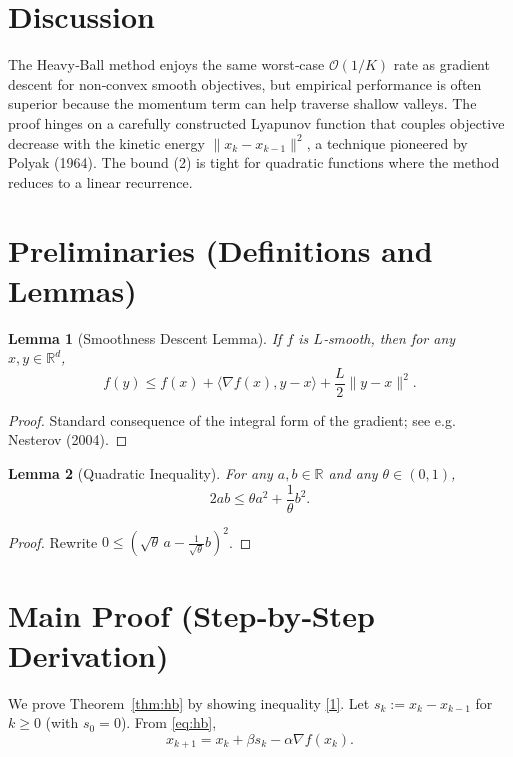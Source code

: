 \documentclass{article}
\newtheorem{lemma}{Lemma}
\newcommand{\R}{\mathbb{R}}
\begin{document}
\section*{Discussion}
The Heavy‑Ball method enjoys the same worst‑case $\mathcal{O}(1/K)$ rate as gradient descent for non‑convex smooth objectives, but empirical performance is often superior because the momentum term can help traverse shallow valleys. The proof hinges on a carefully constructed Lyapunov function that couples objective decrease with the kinetic energy $\|x_{k}-x_{k-1}\|^{2}$, a technique pioneered by Polyak (1964). The bound (2) is tight for quadratic functions where the method reduces to a linear recurrence.

\newpage
\section*{Preliminaries (Definitions and Lemmas)}
\begin{lemma}[Smoothness Descent Lemma]\label{lem:smooth}
If $f$ is $L$‑smooth, then for any $x,y\in\R^{d}$,
\[
f(y)\le f(x)+\langle \nabla f(x),y-x\rangle+\frac{L}{2}\|y-x\|^{2}.
\tag{L1}
\]
\end{lemma}
\begin{proof}
Standard consequence of the integral form of the gradient; see e.g. Nesterov (2004). \qedhere
\end{proof}

\begin{lemma}[Quadratic Inequality]\label{lem:quad}
For any $a,b\in\R$ and any $\theta\in(0,1)$,
\[
2ab\le \theta a^{2}+\frac{1}{\theta}b^{2}.
\tag{L2}
\]
\end{lemma}
\begin{proof}
Rewrite $0\le (\sqrt{\theta}\,a-\frac{1}{\sqrt{\theta}}b)^{2}$. \qedhere
\end{proof}

\section*{Main Proof (Step‑by‑Step Derivation)}
We prove Theorem~\ref{thm:hb} by showing inequality \eqref{1}.  
Let $s_{k}:=x_{k}-x_{k-1}$ for $k\ge0$ (with $s_{0}=0$).  
From \eqref{eq:hb},
\[
x_{k+1}=x_{k}+ \beta s_{k}-\alpha \nabla f(x_{k}) . \tag{P1}
\]
\end{document}
